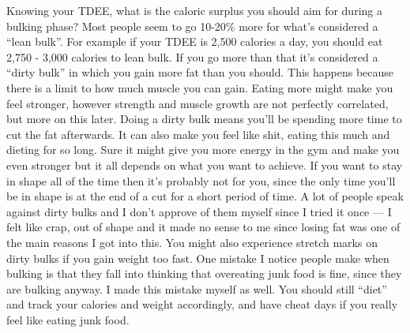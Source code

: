 \documentclass[openany, 12pt]{book}
\begin{document}
	Knowing your TDEE, what is the caloric surplus you should aim for during a bulking phase? Most people seem to go 10-20\% more for what's considered a ``lean bulk''.
        For example if your TDEE is 2,500 calories a day, you should eat 2,750 - 3,000 calories to lean bulk. If you go more than that it's considered a ``dirty bulk'' in which you gain more fat than
        you should. This happens because there is a limit to how much muscle you can gain. Eating more might make you feel stronger, however strength and muscle growth are not perfectly correlated,
        but more on this later. Doing a dirty bulk means you'll be spending more time to cut the fat afterwards. It can also make you feel like shit, eating this much and dieting for so long.
        Sure it might give you more energy in the gym and make you even stronger but it all depends on what you want to achieve. If you want to stay in shape all of the time then it's probably not for you,
        since the only time you'll be in shape is at the end of a cut for a short period of time. A lot of people speak against dirty bulks and
        I don't approve of them myself since I tried it once --- I felt like crap, out of shape and
        it made no sense to me since losing fat was one of the main reasons I got into this. You might also experience stretch marks on dirty bulks if you gain weight too fast.
        One mistake I notice people make when bulking is that they
        fall into thinking that overeating junk food is fine, since they are bulking anyway. I made this mistake myself as well. You should still ``diet'' and track your calories and weight accordingly,
        and have cheat days if you really feel like eating junk food.
	
\end{document}
